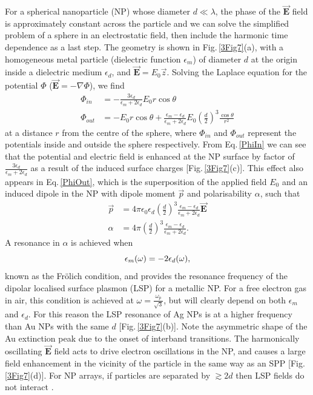 For a spherical nanoparticle (NP) whose diameter $d\ll\lambda$, the phase of the $\vec{\mathbf{E}}$ field is approximately constant across the particle and we can solve the simplified problem of a sphere in an electrostatic field, then include the harmonic time dependence as a last step. The geometry is shown in Fig.\,\ref{3Fig7}(a), with a homogeneous metal particle (dielectric function $\epsilon_m$) of diameter $d$ at the origin inside a dielectric medium $\epsilon_d$, and $\vec{\mathbf{E}} = E_0\vec{z}$. Solving the Laplace equation for the potential $\Phi$ ($\vec{\mathbf{E}} = -\nabla\Phi$), we find
\begin{subequations}
\label{NPlaplace}
\begin{align}
\Phi_{in} &= -\frac{3\epsilon_d}{\epsilon_m+2\epsilon_d}E_0r\cos\theta \label{PhiIn}\\
\Phi_{out} &= -E_0r\cos\theta+\frac{\epsilon_m-\epsilon_d}{\epsilon_m+2\epsilon_d}E_0\left(\frac{d}{2}\right)^3\frac{\cos\theta}{r^2} \label{PhiOut}
\end{align}
\end{subequations}
at a distance $r$ from the centre of the sphere, where $\Phi_{in}$ and $\Phi_{out}$ represent the potentials inside and outside the sphere respectively. From Eq.\,\ref{PhiIn} we can see that the potential and electric field is enhanced at the NP surface by factor of $\frac{3\epsilon_d}{\epsilon_m+2\epsilon_d}$ as a result of the induced surface charges [Fig.\,\ref{3Fig7}(c)]. This effect also appears in Eq.\,\ref{PhiOut}, which is the superposition of the applied field $E_0$ and an induced dipole in the NP with dipole moment $\vec{p}$ and polarisability $\alpha$, such that
\begin{subequations}
\label{NPdipole}
\begin{align}
\vec{p} &=4\pi\epsilon_0\epsilon_d\left(\frac{d}{2}\right)^3\frac{\epsilon_m-\epsilon_d}{\epsilon_m+2\epsilon_d}\vec{\mathbf{E}} \label{NPmoment}\\
\alpha &= 4\pi\left(\frac{d}{2}\right)^3\frac{\epsilon_m-\epsilon_d}{\epsilon_m+2\epsilon_d} \label{NPpolarisability} .
\end{align}
\end{subequations}
A resonance in $\alpha$ is achieved when 
\begin{equation}
\centering
\epsilon_m(\omega) = -2\epsilon_d(\omega) ,
\label{Frolich}
\end{equation}
known as the Fr\"{o}lich condition, and provides the resonance frequency of the dipolar localised surface plasmon (LSP) for a metallic NP. For a free electron gas in air, this condition is achieved at $\omega = \frac{\omega_p}{\sqrt{3}}$, but will clearly depend on both $\epsilon_m$ and $\epsilon_d$. For this reason the LSP resonance of Ag NPs is at a higher frequency than Au NPs with the same $d$ [Fig.\,\ref{3Fig7}(b)]. Note the asymmetric shape of the Au extinction peak due to the onset of interband transitions. The harmonically oscillating $\vec{\mathbf{E}}$ field acts to drive electron oscillations in the NP, and causes a large field enhancement in the vicinity of the particle in the same way as an SPP [Fig.\,\ref{3Fig7}(d)]. For NP arrays, if particles are separated by $\gtrsim2d$ then LSP fields do not interact \cite{Rechberger2003}.
